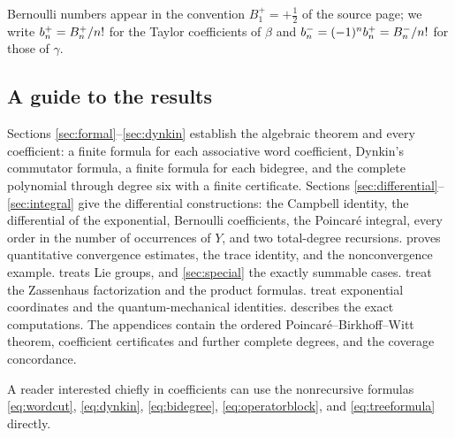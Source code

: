 Bernoulli numbers appear in the convention $B_1^+=+\tfrac12$ of the source
page; we write $b^{+}_{n}=B_n^+/n!$ for the Taylor coefficients of $\beta$ and
$b^{-}_{n}=(-1)^nb^{+}_{n}=B_n^-/n!$ for those of $\gamma$.

\subsection{A guide to the results}
Sections \ref{sec:formal}--\ref{sec:dynkin} establish the algebraic theorem
and every coefficient: a finite formula for each associative word coefficient,
Dynkin's commutator formula, a finite formula for each bidegree, and the
complete polynomial through degree six with a finite certificate. Sections
\ref{sec:differential}--\ref{sec:integral} give the differential
constructions: the Campbell identity, the differential of the exponential,
Bernoulli coefficients, the Poincar\'e integral, every order in the number of
occurrences of $Y$, and two total-degree recursions.
 proves quantitative convergence estimates, the trace
identity, and the nonconvergence example.  treats Lie
groups, and \cref{sec:special} the exactly summable cases.
 treat the Zassenhaus factorization and the
product formulas.  treat exponential
coordinates and the quantum-mechanical identities. 
describes the exact computations. The appendices contain the ordered
Poincar\'e--Birkhoff--Witt theorem, coefficient certificates and further
complete degrees, and the coverage concordance.

A reader interested chiefly in coefficients can use the nonrecursive formulas
\eqref{eq:wordcut}, \eqref{eq:dynkin}, \eqref{eq:bidegree},
\eqref{eq:operatorblock}, and \eqref{eq:treeformula} directly.
